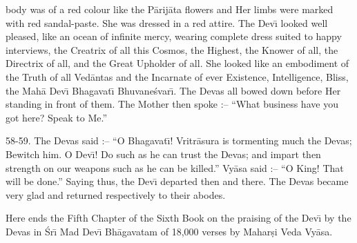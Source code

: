 body was of a red colour like the P\=arij\=ata flowers and Her limbs were marked with red sandal-paste. She was dressed in a red attire. The Dev\={\i} looked well pleased, like an ocean of infinite mercy, wearing complete dress suited to happy interviews, the Creatrix of all this Cosmos, the Highest, the Knower of all, the Directrix of all, and the Great Upholder of all. She looked like an embodiment of the Truth of all Ved\=antas and the Incarnate of ever Existence, Intelligence, Bliss, the Mah\=a Dev\={\i} Bhagavat\={\i} Bhuvane\'svar\={\i}. The Devas all bowed down before Her standing in front of them. The Mother then spoke :-- ``What business have you got here? Speak to Me.''

58-59. The Devas said :-- ``O Bhagavat\={\i}! Vritr\=asura is tormenting much the Devas; Bewitch him. O Dev\={\i}! Do such as he can trust the Devas; and impart then strength on our weapons such as he can be killed.'' Vy\=asa said :-- ``O King! That will be done.'' Saying thus, the Dev\={\i} departed then and there. The Devas became very glad and returned respectively to their abodes.

Here ends the Fifth Chapter of the Sixth Book on the praising of the Dev\={\i} by the Devas in \'Sr\={\i} Mad Dev\={\i} Bh\=agavatam of 18,000 verses by Mahar\d{s}i Veda Vy\=asa.




